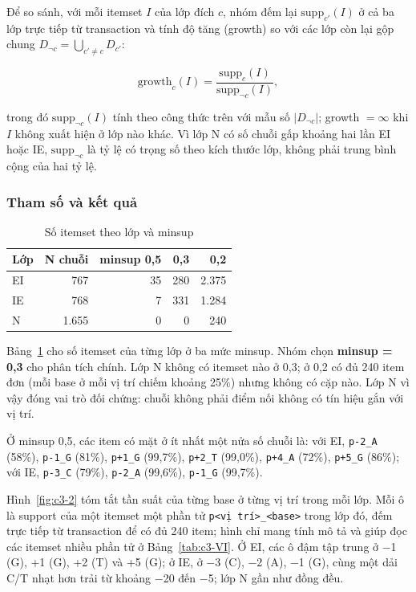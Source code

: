 Để so sánh, với mỗi itemset \(I\) của lớp đích \(c\), nhóm đếm lại \(\mathrm{supp}_{c'}(I)\) ở cả ba lớp trực tiếp từ transaction và tính độ tăng (growth) \cite{dongli} so với các lớp còn lại gộp chung \(D_{\neg c} = \bigcup_{c' \neq c} D_{c'}\):

\begin{equation}
\mathrm{growth}_c(I) = \frac{\mathrm{supp}_c(I)}{\mathrm{supp}_{\neg c}(I)},
\end{equation}

trong đó \(\mathrm{supp}_{\neg c}(I)\) tính theo công thức trên với mẫu số \(|D_{\neg c}|\); growth \(= \infty\) khi \(I\) không xuất hiện ở lớp nào khác. Vì lớp N có số chuỗi gấp khoảng hai lần EI hoặc IE, \(\mathrm{supp}_{\neg c}\) là tỷ lệ có trọng số theo kích thước lớp, không phải trung bình cộng của hai tỷ lệ.

\subsubsection{Tham số và kết quả}

\begin{table}[!t]
\centering\footnotesize
\caption{Số itemset theo lớp và minsup}
\label{tab:c3-V}
\setlength{\tabcolsep}{3pt}
\begin{tabular}{lrrrr}
\hline
\textbf{Lớp} & \textbf{N chuỗi} & \textbf{minsup 0,5} & \textbf{0,3} & \textbf{0,2} \\ \hline
EI & 767 & 35 & 280 & 2.375 \\
IE & 768 & 7 & 331 & 1.284 \\
N & 1.655 & 0 & 0 & 240 \\
\hline
\end{tabular}
\end{table}

Bảng~\ref{tab:c3-V} cho số itemset của từng lớp ở ba mức minsup. Nhóm chọn \textbf{minsup = 0,3} cho phân tích chính. Lớp N không có itemset nào ở 0,3; ở 0,2 có đủ 240 item đơn (mỗi base ở mỗi vị trí chiếm khoảng 25\%) nhưng không có cặp nào. Lớp N vì vậy đóng vai trò đối chứng: chuỗi không phải điểm nối không có tín hiệu gắn với vị trí.

Ở minsup 0,5, các item có mặt ở ít nhất một nửa số chuỗi là: với EI, \texttt{p-2\_A} (58\%), \texttt{p-1\_G} (81\%), \texttt{p+1\_G} (99,7\%), \texttt{p+2\_T} (99,0\%), \texttt{p+4\_A} (72\%), \texttt{p+5\_G} (86\%); với IE, \texttt{p-3\_C} (79\%), \texttt{p-2\_A} (99,6\%), \texttt{p-1\_G} (99,7\%).

Hình~\ref{fig:c3-2} tóm tắt tần suất của từng base ở từng vị trí trong mỗi lớp. Mỗi ô là support của một itemset một phần tử \texttt{p\textless{}vị\ trí\textgreater{}\_\textless{}base\textgreater{}} trong lớp đó, đếm trực tiếp từ transaction để có đủ 240 item; hình chỉ mang tính mô tả và giúp đọc các itemset nhiều phần tử ở Bảng~\ref{tab:c3-VI}. Ở EI, các ô đậm tập trung ở −1 (G), +1 (G), +2 (T) và +5 (G); ở IE, ở −3 (C), −2 (A), −1 (G), cùng một dải C/T nhạt hơn trải từ khoảng −20 đến −5; lớp N gần như đồng đều.

